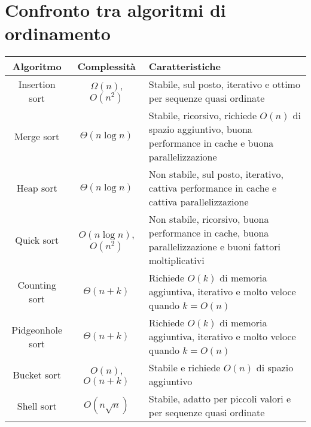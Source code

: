 \section{Confronto tra algoritmi di ordinamento}
\begin{table}[h!]
\centering
\renewcommand{\arraystretch}{1.2}
\begin{tabular}{|c|c|p{}|}
    \hline
    \textbf{Algoritmo} & \textbf{Complessità} & \textbf{Caratteristiche}\\
    \hline
    Insertion sort & $\Omega(n)$, $O(n^2)$ & Stabile, sul posto, iterativo
    e ottimo per sequenze quasi ordinate\\
    \hline
    Merge sort & $\Theta(n\log n)$ & Stabile, ricorsivo, richiede $O(n)$ di
    spazio aggiuntivo, buona performance in cache e buona parallelizzazione\\
    \hline
    Heap sort & $\Theta(n\log n)$ & Non stabile, sul posto, iterativo, 
    cattiva performance in cache e cattiva parallelizzazione\\
    \hline
    Quick sort & $O(n\log n)$, $O(n^2)$ & Non stabile, ricorsivo, buona
    performance in cache, buona parallelizzazione e buoni fattori
    moltiplicativi\\
    \hline
    Counting sort & $\Theta(n+k)$ & Richiede $O(k)$ di memoria aggiuntiva,
    iterativo e molto veloce quando $k=O(n)$\\
    \hline
    Pidgeonhole sort & $\Theta(n+k)$ & Richiede $O(k)$ di memoria aggiuntiva,
    iterativo e molto veloce quando $k=O(n)$\\
    \hline
    Bucket sort & $O(n)$, $O(n+k)$ & Stabile e richiede $O(n)$ di spazio
    aggiuntivo\\
    \hline
    Shell sort & $O(n\sqrt{n})$ & Stabile, adatto per piccoli valori e
    per sequenze quasi ordinate\\
    \hline
\end{tabular}
\end{table}